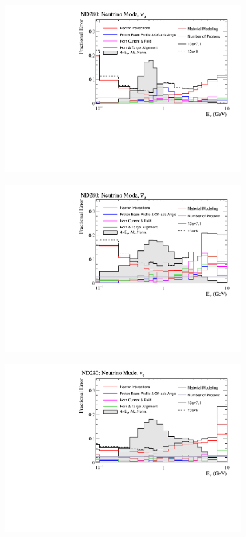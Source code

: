 \begin{figure}[!htbp]
\begin{subfigure}{.49\textwidth}
  \centering
  \includegraphics[width=0.99\linewidth]{figs/flux_error_t2k_nd5_fhc_numu}
\end{subfigure}
\begin{subfigure}{.49\textwidth}
  \centering
  \includegraphics[width=0.99\linewidth]{figs/flux_error_t2k_nd5_fhc_numubar}
\end{subfigure}
\begin{subfigure}{.49\textwidth}
  \centering
  \includegraphics[width=0.99\linewidth]{figs/flux_error_t2k_nd5_fhc_nue}

\end{subfigure}
\end{figure}
